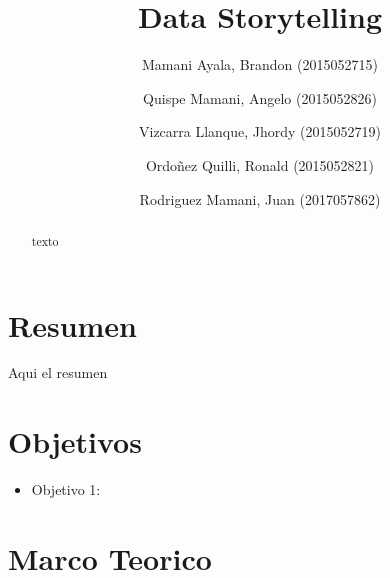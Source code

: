 \documentclass[preprint,12pt]{elsarticle}
\begin{document}
	
	\begin{frontmatter}
		
		
		\title{\huge Data Storytelling}
		
		\author{Mamani Ayala, Brandon        (2015052715)}
		\author{Quispe Mamani, Angelo	      (2015052826)}
		\author{Vizcarra Llanque, Jhordy	      (2015052719)}
		\author{Ordoñez Quilli, Ronald          (2015052821)}
		\author{Rodriguez Mamani, Juan      (2017057862)}
		
		\address{Tacna, Perú}
		
		\begin{abstract}
			texto
	
		\end{abstract}
\end{frontmatter}

	
	
	\section{Resumen}
		Aqui el resumen
\\

	
	

\section{Objetivos}
		\begin{itemize}
		\item Objetivo 1: 
	\end{itemize}

	
	

\section{Marco Teorico}
	
\end{document}
